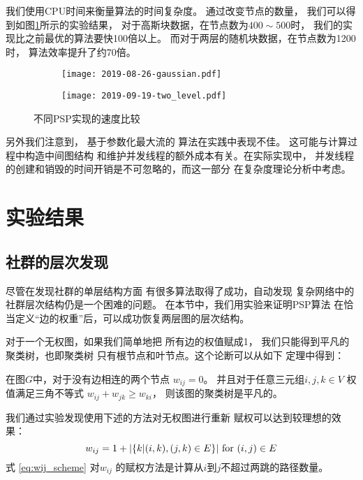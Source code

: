 我们使用CPU时间来衡量算法的时间复杂度。
通过改变节点的数量，
我们可以得到如图\ref{fig:esc}所示的实验结果，
对于高斯块数据，在节点数为$400\sim 500$时，
我们的实现比之前最优的算法要快100倍以上。
而对于两层的随机块数据，在节点数为1200时，
算法效率提升了约70倍。
\begin{figure}
	\centering
	\begin{subfigure}{0.45\textwidth}
		\texttt{[image: 2019-08-26-gaussian.pdf]}
	\end{subfigure}
	\begin{subfigure}{0.45\textwidth}
		\texttt{[image: 2019-09-19-two\_level.pdf]}
	\end{subfigure}
	\caption{
  不同PSP实现的速度比较}\label{fig:esc}
\end{figure}

另外我们注意到，
基于参数化最大流的
算法\citep{kolmogorov}在实践中表现不佳。
这可能与计算过程中构造中间图结构
和维护并发线程的额外成本有关。在实际实现中，
并发线程的创建和销毁的时间开销是不可忽略的，而这一部分
在复杂度理论分析中考虑。

\section{实验结果}
\subsection{社群的层次发现}
\label{subsec:cd}
尽管在发现社群的单层结构方面
有很多算法取得了成功，自动发现
复杂网络中的社群层次结构仍是一个困难的问题。
在本节中，我们用实验来证明PSP算法
在恰当定义“边的权重”后，可以成功恢复两层图的层次结构。

对于一个无权图，如果我们简单地把
所有边的权值赋成1，
我们只能得到平凡的聚类树，也即聚类树
只有根节点和叶节点。这个论断可以从如下
定理中得到：
\begin{theorem}\label{thm:triangle}
  在图$G$中，对于没有边相连的两个节点 $w_{ij}=0$。
  并且对于任意三元组$i,j,k \in V$ 权值满足三角不等式 
  $w_{ij} + w_{jk} \geq w_{ki}$，
  则该图的聚类树是平凡的。
\end{theorem}
  
我们通过实验发现使用下述的方法对无权图进行重新
赋权可以达到较理想的效果：
\begin{equation}\label{eq:wij_scheme}
    w_{ij} = 1 + \lvert\{k | (i,k),(j,k) \in E \}\rvert \textrm{ for } (i,j) \in E
\end{equation}
式 \eqref{eq:wij_scheme} 对$w_{ij}$
的赋权方法是计算从$i$到$j$不超过两跳的路径数量。

